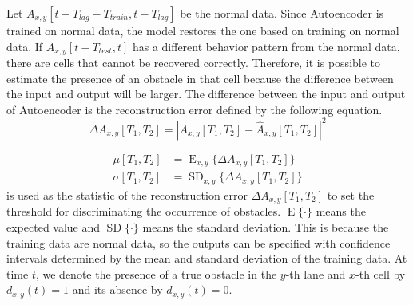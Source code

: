 \documentclass[paper]{ieice}
\newcommand{\abs}[1]{\left\lvert#1\right\rvert}
\DeclareMathOperator*{\E}{E}
\DeclareMathOperator*{\SD}{SD}
\begin{document}
Let $A_{x,y}[t-T_{lag}-T_{train},t-T_{lag}]$ be the normal data.
%
Since Autoencoder is trained on normal data, the model restores the one based on training on normal data.
%
If $A_{x,y}[t-T_{test},t]$ has a different behavior pattern from the normal data, there are cells that cannot be recovered correctly.
%
Therefore, it is possible to estimate the presence of an obstacle in that cell because the difference between the input and output will be larger.
%
The difference between the input and output of Autoencoder is the reconstruction error defined by the following equation.
%
\begin{equation}
  \Delta A_{x,y}[T_1,T_2]=\abs{A_{x,y}[T_1,T_2]-\hat{A}_{x,y}[T_1,T_2]}^{2}
  \label{eq:reconstitute_error}
\end{equation}
%
%
\par
\begin{align}
  \mu[T_1,T_2]    & = \E_{x,y}\{\Delta A_{x,y}[T_1,T_2]\}  \\
  \sigma[T_1,T_2] & = \SD_{x,y}\{\Delta A_{x,y}[T_1,T_2]\}
\end{align}
%
is used as the statistic of the reconstruction error $\Delta A_{x,y}[T_1,T_2]$ to set the threshold for discriminating the occurrence of obstacles.
%
$\E\{\cdot\}$ means the expected value and $\SD\{\cdot\}$ means the standard deviation.
%
This is because the training data are normal data, so the outputs can be specified with confidence intervals determined by the mean and standard deviation of the training data.
%
At time $t$, we denote the presence of a true obstacle in the $y$-th lane and $x$-th cell by $d_{x, y}(t)=1$ and its absence by $d_{x, y}(t)=0$.
\end{document}
